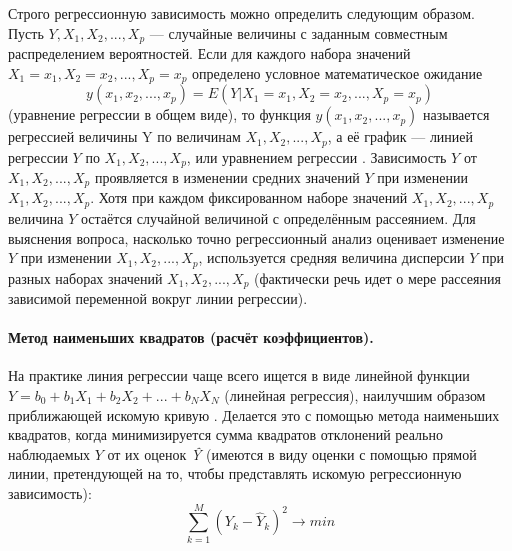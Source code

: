 Строго регрессионную зависимость можно определить следующим образом. Пусть $Y, X_1, X_2,...,X_p$  — случайные величины с заданным совместным распределением вероятностей. Если для каждого набора значений $X_1=x_1,X_2=x_2,...,X_p=x_p$ определено условное математическое ожидание
\begin{equation*}
y(x_1,x_2,...,x_p) = E(Y|X_1 = x_1, X_2 = x_2, ..., X_p = x_p)
\end{equation*}
(уравнение регрессии в общем виде), то функция $y(x_1,x_2,...,x_p)$ называется регрессией величины Y по величинам $X_1,X_2,...,X_p$, а её график — линией регрессии $Y$ по $X_1,X_2,...,X_p$, или уравнением регрессии \cite{applregr}.
Зависимость $Y$ от $X_1,X_2,...,X_p$ проявляется в изменении средних значений $Y$ при изменении $X_1,X_2,...,X_p$. Хотя при каждом фиксированном наборе значений $X_1,X_2,...,X_p$ величина $Y$ остаётся случайной величиной с определённым рассеянием.
Для выяснения вопроса, насколько точно регрессионный анализ оценивает изменение $Y$ при изменении $X_1,X_2,...,X_p$, используется средняя величина дисперсии $Y$ при разных наборах значений $X_1,X_2,...,X_p$ (фактически речь идет о мере рассеяния зависимой переменной вокруг линии регрессии).

\paragraph{Метод наименьших квадратов (расчёт коэффициентов).}

На практике линия регрессии чаще всего ищется в виде линейной функции $Y = b_0 + b_1 X_1 + b_2 X_2 + ... + b_N X_N$ (линейная регрессия), наилучшим образом приближающей искомую кривую \cite{regrmeth}. Делается это с помощью метода наименьших квадратов, когда минимизируется сумма квадратов отклонений реально наблюдаемых $Y$ от их оценок \textit{\^Y} (имеются в виду оценки с помощью прямой линии, претендующей на то, чтобы представлять искомую регрессионную зависимость):
\begin{equation*}
\sum\limits_{k=1}^{M}{(Y_k - \hat{Y}_k)^2} \rightarrow min
\end{equation*}

